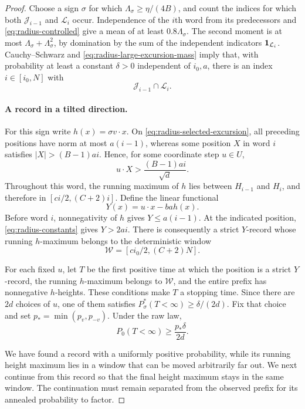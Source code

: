 \begin{proof}
Choose a sign $\sigma$ for which $\Lambda_\sigma\ge\eta/(4B)$, and count
the indices for which both $\mathcal J_{i-1}$ and $\mathcal L_i$ occur.
Independence of the $i$th word from its predecessors and
\eqref{eq:radius-controlled} give a mean of at least
$0.8\Lambda_\sigma$.  The second moment is at most
$\Lambda_\sigma+\Lambda_\sigma^2$, by domination by the sum of the
independent indicators $\mathbf 1_{\mathcal L_i}$.
Cauchy--Schwarz and \eqref{eq:radius-large-excursion-mass} imply that,
with probability at least a constant $\delta>0$ independent of $i_0,a$,
there is an index $i\in[i_0,N]$ with
\begin{equation}
  \mathcal J_{i-1}\cap\mathcal L_i.
  \label{eq:radius-selected-excursion}
\end{equation}

\paragraph{A record in a tilted direction.}
For this sign write $h(x)=\sigma v\cdot x$.  On
\eqref{eq:radius-selected-excursion}, all preceding positions have norm
at most $a(i-1)$, whereas some position $X$ in word $i$ satisfies
$|X|>(B-1)ai$.  Hence, for some coordinate step $u\in U$,
\[
  u\cdot X>\frac{(B-1)ai}{\sqrt d}.
\]
Throughout this word, the running maximum of $h$ lies between
$H_{i-1}$ and $H_i$, and therefore in
$[ci/2,(C+2)i]$.  Define the linear functional
\[
  Y(x)=u\cdot x-ba h(x).
\]
Before word $i$, nonnegativity of $h$ gives $Y\le a(i-1)$.
At the indicated position, \eqref{eq:radius-constants} gives $Y>2ai$.
There is consequently a strict $Y$-record whose running $h$-maximum
belongs to the deterministic window
\begin{equation}
  \mathcal W=[ci_0/2,(C+2)N].
  \label{eq:radius-window}
\end{equation}

For each fixed $u$, let $T$ be the first positive time at which the
position is a strict $Y$-record, the running $h$-maximum belongs to
$\mathcal W$, and the entire prefix has nonnegative $h$-heights.
These conditions make $T$ a stopping time.  Since there are $2d$
choices of $u$, one of them satisfies
$P_\sigma^*(T<\infty)\ge\delta/(2d)$.  Fix that choice and set
$p_* = \min(p_v,p_{-v})$.  Under the raw law,
\begin{equation}
  P_0(T<\infty)\ge\frac{p_*\delta}{2d}.
  \label{eq:radius-record-probability}
\end{equation}

We have found a record with a uniformly positive probability, while its
running height maximum lies in a window that can be moved arbitrarily
far out.  We next continue from this record so that the final height
maximum stays in the same window.  The continuation must remain
separated from the observed prefix for its annealed probability to
factor.


\end{proof}
